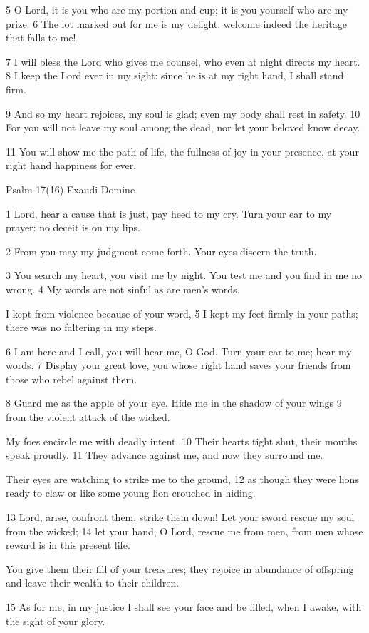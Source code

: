 5 O Lord, it is you who are my portion and cup;
it is you yourself who are my prize.
6 The lot marked out for me is my delight:
welcome indeed the heritage that falls to me!

7 I will bless the Lord who gives me counsel,
who even at night directs my heart.
8 I keep the Lord ever in my sight:
since he is at my right hand, I shall stand firm.

9 And so my heart rejoices, my soul is glad;
even my body shall rest in safety.
10 For you will not leave my soul among the dead,
nor let your beloved know decay.

11 You will show me the path of life,
the fullness of joy in your presence,
at your right hand happiness for ever.


Psalm 17(16) Exaudi Domine

1 Lord, hear a cause that is just,
pay heed to my cry.
Turn your ear to my prayer:
no deceit is on my lips.

2 From you may my judgment come forth.
Your eyes discern the truth.

3 You search my heart, you visit me by night.
You test me and you find in me no wrong.
4 My words are not sinful as are men's words.

I kept from violence because of your word,
5 I kept my feet firmly in your paths;
there was no faltering in my steps.

6 I am here and I call, you will hear me, O God.
Turn your ear to me; hear my words.
7 Display your great love, you whose right hand saves
your friends from those who rebel against them.

8 Guard me as the apple of your eye.
Hide me in the shadow of your wings
9 from the violent attack of the wicked.

My foes encircle me with deadly intent.
10 Their hearts tight shut, their mouths speak proudly.
11 They advance against me, and now they surround me.

Their eyes are watching to strike me to the ground,
12 as though they were lions ready to claw
or like some young lion crouched in hiding.

13 Lord, arise, confront them, strike them down!
Let your sword rescue my soul from the wicked;
14 let your hand, O Lord, rescue me from men,
from men whose reward is in this present life.

You give them their fill of your treasures;
they rejoice in abundance of offspring
and leave their wealth to their children.

15 As for me, in my justice I shall see your face
and be filled, when I awake, with the sight of your glory.



